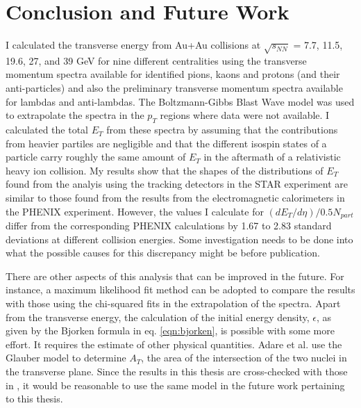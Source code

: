 \chapter{Conclusion and Future Work} \label{ch:conclusion}
I calculated the transverse energy from Au+Au collisions at $\sqrt{s_{NN}}$ = 7.7, 11.5, 19.6, 27, and 39 GeV for nine different centralities using the transverse momentum spectra available for identified pions, kaons and protons (and their anti-particles) and also the preliminary transverse momentum spectra available for lambdas and anti-lambdas. The Boltzmann-Gibbs Blast Wave model was used to extrapolate the spectra in the $p_{T}$ regions where data were not available. I calculated the total $E_{T}$ from these spectra by assuming that the contributions from heavier partiles are negligible and that the different isospin states of a particle carry roughly the same amount of $E_{T}$ in the aftermath of a relativistic heavy ion collision. My results show that the shapes of the distributions of $E_{T}$ found from the analyis using the tracking detectors in the STAR experiment are similar to those found from the results from the electromagnetic calorimeters in the PHENIX experiment. However, the values I calculate for $(dE_{T}/d\eta)/0.5N_{part}$ differ from the corresponding PHENIX calculations by 1.67 to 2.83 standard deviations at different collision energies. Some investigation needs to be done into what the possible causes for this discrepancy might be before publication.%

There are other aspects of this analysis that can be improved in the future. For instance, a maximum likelihood fit method can be adopted to compare the results with those using the chi-squared fits in the extrapolation of the spectra. Apart from the transverse energy, the calculation of the initial energy density, $\epsilon$, as given by the Bjorken formula in eq. \ref{eqn:bjorken}, is possible with some more effort. It requires the estimate of other physical quantities. Adare et al.\cite{PhysRevC.93.024901} use the Glauber model to determine $A_{T}$, the area of the intersection of the two nuclei in the transverse plane. Since the results in this thesis are cross-checked with those in \cite{PhysRevC.93.024901}, it would be reasonable to use the same model in the future work pertaining to this thesis.%

